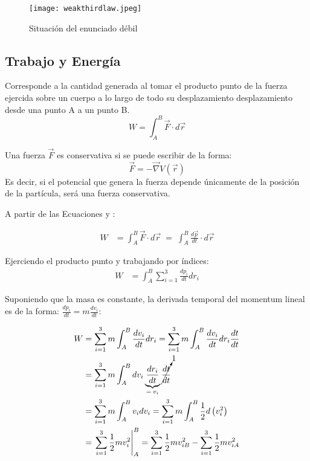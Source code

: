 \documentclass[/home/hernan-barquero/Documents/Apuntes_mecanica_teorica/main.tex]{subfiles}
\begin{document}
	\begin{marginfigure}
		\begin{figure}[H]
			\centering
			\texttt{[image: weakthirdlaw.jpeg]}
			\caption{Situación del enunciado débil}
			\label{fig: Nthirdweak}
		\end{figure}
	\end{marginfigure}

	\subsection{Trabajo y Energía}

	\begin{definition} Corresponde a la cantidad generada al tomar el producto punto de la fuerza ejercida sobre un cuerpo a lo largo de todo su desplazamiento desplazamiento desde una punto A a un punto B.
		\begin{equation}
			W = \int_{A}^{B} \vec{F} \cdot d\vec{r}
			\label{eq: work}
		\end{equation}
	\end{definition}

	\begin{definition} Una fuerza $\vec{F}$ es conservativa si se puede escribir de la forma:
		\begin{equation}
			\vec{F} = - \vec{\nabla} V \left(\vec{r}\right)
			\label{eq: conservativeforce}
		\end{equation}
		Es decir, si el potencial que genera la fuerza depende únicamente de la posición de la partícula, será una fuerza conservativa.
	\end{definition}

	A partir de las Ecuaciones  y :

	\begin{align*}
		W & = \int_{A}^{B} \vec{F} \cdot d\vec{r} \; = \; \int_{A}^{B}  \frac{d \vec{p}}{dt} \cdot d\vec{r}
	\end{align*}

	Ejerciendo el producto punto y trabajando por índices:
	\begin{align*}
		W & = \int_{A}^{B} \sum_{i=1}^{3} \frac{d p_{i}}{dt}dr_{i}
	\end{align*}

	Suponiendo que la masa es constante, la derivada temporal del momentum lineal es de la forma: $\frac{d p_{i}}{dt} = m \frac{d v_{i}}{dt}$:

	\begin{align*}
		W & =  \sum_{i=1}^{3} m \int_{A}^{B} \frac{d v_{i}}{dt}dr_{i} =  \sum_{i=1}^{3} m \int_{A}^{B} \frac{d v_{i}}{dt}dr_{i} \frac{dt}{dt}\\ 
		& = \sum_{i=1}^{3} m \int_{A}^{B} d v_{i} \underbrace{\frac{d r_{i}}{dt}}_{= \: v_{i}} \cancelto{1}{\frac{dt}{dt}}\\
		& = \sum_{i=1}^{3} m \int_{A}^{B}  v_{i} d v_{i} =  \sum_{i=1}^{3} m \int_{A}^{B} \frac{1}{2} d \left(v_{i}^{2}\right)\\
		& = \left . \sum_{i=1}^{3} \frac{1}{2} m v_{i}^{2} \right|_{A} ^{B} = \sum_{i=1}^{3} \frac{1}{2} m v_{iB}^{2} - \sum_{i=1}^{3} \frac{1}{2} m v_{iA}^{2}
	\end{align*}
\end{document}
